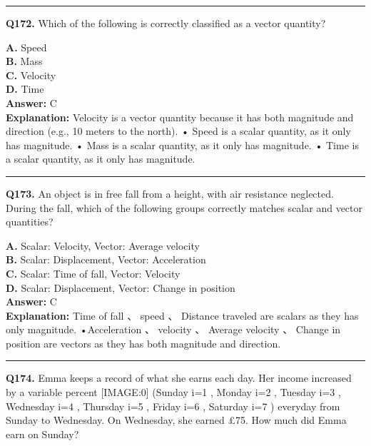 \documentclass[12pt]{article}
\begin{document}
\hrule
\vspace{1em}


\noindent
\textbf{Q172.} Which of the following is correctly classified as a vector quantity?



\textbf{A.} Speed \\
\textbf{B.} Mass \\
\textbf{C.} Velocity \\
\textbf{D.} Time \\

\textbf{Answer:} C \\
\textbf{Explanation:} Velocity is a vector quantity because it has both magnitude and direction (e.g.,
10 meters to the north).
• Speed is a scalar quantity, as it only has magnitude.
• Mass is a scalar quantity, as it only has magnitude.
• Time is a scalar quantity, as it only has magnitude.

\hrule
\vspace{1em}


\noindent
\textbf{Q173.} An object is in free fall from a height, with air resistance neglected. During the fall, which of the following groups correctly matches scalar and vector quantities?



\textbf{A.} Scalar: Velocity, Vector: Average velocity \\
\textbf{B.} Scalar: Displacement, Vector: Acceleration \\
\textbf{C.} Scalar: Time of fall, Vector: Velocity \\
\textbf{D.} Scalar: Displacement, Vector: Change in position \\

\textbf{Answer:} C \\
\textbf{Explanation:} Time of fall
、
speed
、
Distance traveled are scalars as they has only magnitude.
•Acceleration
、
velocity
、
Average velocity
、
Change in position are vectors as they has both magnitude and direction.

\hrule
\vspace{1em}


\noindent
\textbf{Q174.} Emma keeps a record of what she earns each day.
Her income increased by a variable percent
[IMAGE:0]
(Sunday i=1
, Monday i=2
, Tuesday i=3
, Wednesday i=4
, Thursday i=5
, Friday i=6
, Saturday i=7
) everyday from Sunday to Wednesday.
On Wednesday, she earned £75. How much did Emma earn on Sunday?
\end{document}
